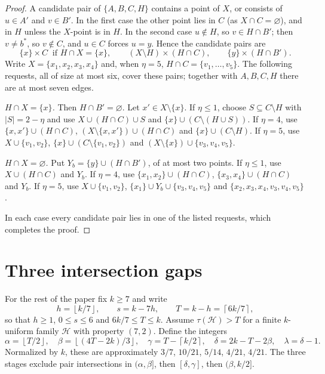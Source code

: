 \documentclass[11pt]{article}
\numberwithin{equation}{section}
\theoremstyle{definition}
\theoremstyle{remark}
\newcommand{\HH}{\mathcal H}
\newcommand{\ceil}[1]{\left\lceil #1\right\rceil}
\newcommand{\floor}[1]{\left\lfloor #1\right\rfloor}
\begin{document}
\begin{proof}
A candidate pair of $\{A,B,C,H\}$ contains a point of $X$, or consists of
$u\in A'$ and $v\in B'$. In the first case the other point lies in $C$
(as $X\cap C=\varnothing$), and in $H$ unless the $X$-point is in $H$. In
the second case $u\notin H$, so $v\in H\cap B'$; then $v\ne b^*$, so
$v\notin C$, and $u\in C$ forces $u=y$. Hence the candidate pairs are
\[
 \{x\}\times C\ \text{ if } H\cap X=\{x\},\qquad
 (X\setminus H)\times(H\cap C),\qquad \{y\}\times(H\cap B').
\]
Write $X=\{x_1,x_2,x_3,x_4\}$ and, when $\eta=5$,
$H\cap C=\{v_1,\dots,v_5\}$. The following requests, all of size at most
six, cover these pairs; together with $A,B,C,H$ there are at most seven
edges.

\emph{$H\cap X=\{x\}$.} Then $H\cap B'=\varnothing$. Let $x'\in X\setminus\{x\}$.
If $\eta\le1$, choose $S\subseteq C\setminus H$ with $|S|=2-\eta$ and use
$X\cup(H\cap C)\cup S$ and $\{x\}\cup(C\setminus(H\cup S))$. If $\eta=4$, use
$\{x,x'\}\cup(H\cap C)$, $(X\setminus\{x,x'\})\cup(H\cap C)$ and
$\{x\}\cup(C\setminus H)$. If $\eta=5$, use $X\cup\{v_1,v_2\}$,
$\{x\}\cup(C\setminus\{v_1,v_2\})$ and $(X\setminus\{x\})\cup\{v_3,v_4,v_5\}$.

\emph{$H\cap X=\varnothing$.} Put $Y_b=\{y\}\cup(H\cap B')$, of at most two
points. If $\eta\le1$, use $X\cup(H\cap C)$ and $Y_b$. If $\eta=4$, use
$\{x_1,x_2\}\cup(H\cap C)$, $\{x_3,x_4\}\cup(H\cap C)$ and $Y_b$. If
$\eta=5$, use $X\cup\{v_1,v_2\}$, $\{x_1\}\cup Y_b\cup\{v_3,v_4,v_5\}$ and
$\{x_2,x_3,x_4,v_3,v_4,v_5\}$.

In each case every candidate pair lies in one of the listed requests,
which completes the proof.
\end{proof}

\section{Three intersection gaps}\label{sec:gaps}

For the rest of the paper fix $k\ge7$ and write
\[
 h=\floor{k/7},\qquad s=k-7h,\qquad T=k-h=\ceil{6k/7},
\]
so that $h\ge1$, $0\le s\le6$ and $6k/7\le T\le k$. Assume
$\tau(\HH)>T$ for a finite $k$-uniform family $\HH$ with property
$(7,2)$. Define the integers
\begin{equation}\label{eq:endpoints}
 \alpha=\floor{T/2},\quad \beta=\floor{(4T-2k)/3},\quad
 \gamma=T-\ceil{k/2},\quad \delta=2k-T-2\beta,\quad \lambda=\delta-1.
\end{equation}
Normalized by $k$, these are approximately $3/7$, $10/21$, $5/14$,
$4/21$, $4/21$. The three stages exclude pair intersections in
$(\alpha,\beta]$, then $[\delta,\gamma]$, then $(\beta,k/2]$.
\end{document}
